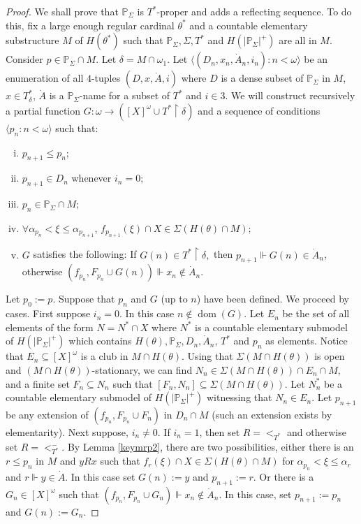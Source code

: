 \documentclass{amsart}
\theoremstyle{definition}
\renewcommand{\P}{\mathbb{P}}
\newcommand{\dt}[1]{\dot{#1}}
\newcommand{\forces}{\Vdash}
\DeclareMathOperator{\dom}{dom}
\begin{document}
\begin{proof}
 We shall prove that $\mathbb{P}_\Sigma$ is $T^*$-proper and adds a reflecting sequence. To do this, fix a large enough regular cardinal $\theta^*$ and a countable elementary substructure $M$ of $H(\theta^*)$ such that  $\mathbb{P}_\Sigma, \Sigma, T^*$ and $H(|\mathbb{P}_\Sigma|^+)$ are all in $M$. Consider $p\in \mathbb{P}_\Sigma\cap M.$ Let $\delta=M\cap \omega_1.$
Let $\langle (D_n, x_n,\dot A_n,i_n):n<\omega\rangle$ be an enumeration of all $4$-tuples $(D,x,\dot A,i)$ where $D$ is a dense subset of $\mathbb{P}_\Sigma$ in $M$, $x\in T^*_\delta$, $\dot A$ is a $\P_\Sigma$-name for a subset of $T^*$ and $i\in 3$. We will construct recursively a partial function $G:\omega\to ([X]^\omega\cup T^*\restriction \delta)$ and a sequence of conditions $\langle p_n:n<\omega\rangle $     such that:
\begin{enumerate}[(i)]
    \item $p_{n+1}\leq p_n$;
    \item $p_{n+1}\in D_n$ whenever $i_n=0$;
    \item $p_n \in \mathbb{P}_\Sigma\cap M;$
    \item $\forall \alpha_{p_n}< \xi\leq \alpha_{p_{n+1}}$, $  f_{p_{n+1}}(\xi)\cap X\in \Sigma(H(\theta)\cap M);  $
    \item $G$ satisfies the following:
     If $G(n)\in T^*\restriction \delta,$ then $p_{n+1}\forces G(n)\in \dt{A}_n$, otherwise
    $(f_{p_n},F_{p_{n}}\cup G(n))\forces x_n\notin \dt{A}_n$.
\end{enumerate}
  Let $p_0:=p$. Suppose that $p_n$ and $G$ (up to $n$) have been defined. We proceed by cases. First suppose $i_n=0$. In this case $n\notin \dom(G)$. Let $E_n $ be the set of all elements of the form $N=N^*\cap X$ where $N^*$ is a countable elementary submodel of $H(|\mathbb{P}_\Sigma|^+)$   which contains $H(\theta), \P_\Sigma,  D_n, \dot A_n$, $T^*$ and $p_n$ as elements. Notice that $E_n\subseteq [X]^\omega$ is a club in $M\cap H(\theta)$. Using that $\Sigma(M\cap H(\theta))$ is open and $(M\cap H(\theta))$-stationary, we can find $N_n\in \Sigma(M\cap H(\theta))\cap E_n\cap M, $ and a finite set $F_n\subseteq N_n$ such that $[F_n,N_n]\subseteq \Sigma(M\cap H(\theta)). $  Let $N_n^*$ be a countable elementary submodel of $H(|\mathbb{P}_\Sigma|^+)$ witnessing that $N_n\in E_n$. Let $p_{n+1}$ be any extension of $ (f_{p_n},F_{p_n}\cup F_n)$ in $D_n\cap M$ (such an extension exists by elementarity). Next suppose, $i_n\ne 0$. If $i_n=1$, then set $R=<_{T^*}$ and otherwise set $R=<_{T^*}^-$.  By Lemma \ref{keymrp2}, there are two possibilities, either there is an $r\leq p_n$ in $M$ and $yRx$ such that  $f_r(\xi)\cap X\in \Sigma(H(\theta)\cap M)$ for $\alpha_{p_n}<\xi\leq \alpha_r$ and $r\Vdash y\in \dot A$. In this case set $G(n):=y$ and $p_{n+1}:=r$. Or there is a $G_n\in[X]^\omega$ such that $(f_{p_n},F_{p_n}\cup G_n)\Vdash x_n\notin \dot A_n$. In this case, set $p_{n+1}:=p_n$ and $G(n):=G_n$.





\end{proof}
\end{document}
